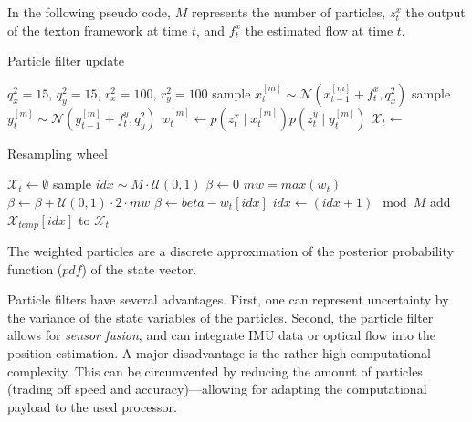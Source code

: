 \documentclass{report}
\begin{document}
In the following pseudo code, $M$ represents the number of particles,
$z_t^x$ the output of the texton framework at time $t$, and $f_t^x$
the estimated flow at time $t$.
\begin{algorithm}
\caption{Particle filter update}
\label{alg:particle_filter}
\begin{algorithmic}[1]
  \State $q_x^2 = 15$, $q_y^2 = 15$, $r_x^2 = 100$, $r_y^2 = 100$
  \State sample $x_t^{[m]} \sim \mathcal{N}(x_{t-1}^{[m]} + f_t^x, q_x^2)$
  \State sample $y_t^{[m]} \sim \mathcal{N}(y_{t-1}^{[m]} + f_t^y, q_y^2)$
  \State $w_t^{[m]} \gets p(z_t^x \mid x_t^{[m]}) p(z_t^y \mid y_t^{[m]})$
  \EndFor
  \State $\mathcal{X}_t \gets$ 
  \EndProcedure
\end{algorithmic}
\end{algorithm}

\begin{algorithm}
\caption{Resampling wheel}
\label{alg:resampling_wheel}
  \begin{algorithmic}[1]
    \State $\mathcal{X}_t \gets \emptyset$
    \State sample $idx \sim M\cdot\mathcal{U}(0, 1)$
    \State $\beta \gets 0$
    \State $mw = max(w_t)$
    \State $\beta \gets \beta + \mathcal{U}(0, 1)\cdot 2\cdot mw$
    \State $\beta \gets beta - w_t[idx]$
    \State $idx \gets (idx + 1) \mod M$
    \EndWhile
    \State add $\mathcal{X}_{temp}[idx]$ to $\mathcal{X}_t$
    \EndFor
\EndProcedure
\end{algorithmic}
\end{algorithm}

The weighted particles are a discrete approximation of the posterior
probability function ($pdf$) of the state vector.

Particle filters have several advantages. First, one can represent
uncertainty by the variance of the state variables of the
particles. Second, the particle filter allows for \emph{sensor
  fusion}, and can integrate IMU data or optical flow into the
position estimation.  A major disadvantage is the rather high
computational complexity. This can be circumvented by reducing the
amount of particles (trading off speed and accuracy)---allowing for
adapting the computational payload to the used processor.
\end{document}
